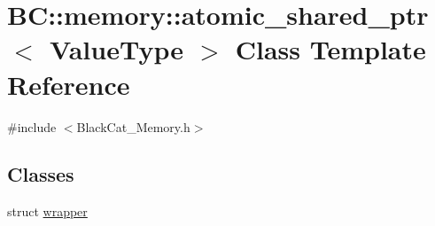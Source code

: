 \hypertarget{classBC_1_1memory_1_1atomic__shared__ptr}{}\section{BC\+:\+:memory\+:\+:atomic\+\_\+shared\+\_\+ptr$<$ Value\+Type $>$ Class Template Reference}
\label{classBC_1_1memory_1_1atomic__shared__ptr}


{\ttfamily \#include $<$Black\+Cat\+\_\+\+Memory.\+h$>$}

\subsection*{Classes}
\begin{DoxyCompactItemize}
\item 
struct \hyperlink{structBC_1_1memory_1_1atomic__shared__ptr_1_1wrapper}{wrapper}
\end{DoxyCompactItemize}
